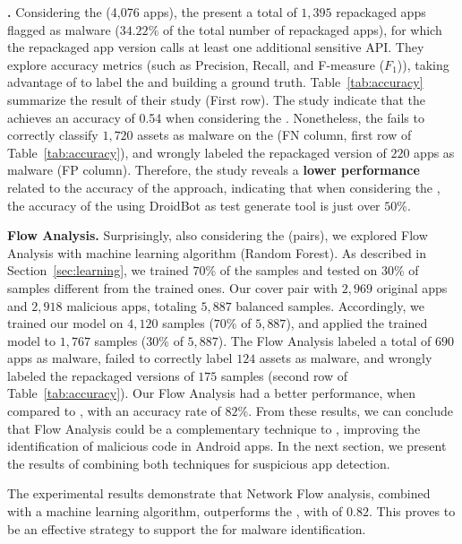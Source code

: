 {\bf \mas.} Considering the \cds (4,076 apps), the \fhc present
a total of {$1,395$} repackaged apps flagged as malware ({$34.22$\%} of the total number of repackaged apps), for which the repackaged app version calls at least one additional sensitive API. They explore accuracy metrics (such as Precision, Recall, and F-measure ($F_1$)), taking advantage of \vt to label the \cds and building a ground truth. Table~\ref{tab:accuracy} summarize the result of their study (First row). The study indicate that the \mas achieves an accuracy of 0.54 when considering the \cds. Nonetheless, the \mas fails to correctly classify $1,720$ assets as malware on the \cds (FN column, first row of Table~\ref{tab:accuracy}), and wrongly labeled the repackaged version of $220$ apps as malware (FP column). Therefore, the study reveals a {\bf lower performance} related to the accuracy of the approach, indicating that when considering the \cds, the accuracy of the \mas using DroidBot as test generate tool is just over $50$\%.

{\bf Flow Analysis.} Surprisingly, also considering the \cds (\apps pairs), we explored Flow Analysis with machine learning algorithm (Random Forest). As described in Section~\ref{sec:learning}, we trained $70$\% of the samples and tested on $30$\% of samples different from the trained ones. Our \cds cover \apps pair with $2,969$ original apps and $2,918$ malicious apps, totaling $5,887$ balanced samples. Accordingly, we trained our model on $4,120$ samples ($70$\% of $5,887$), and applied the trained model to $1,767$ samples ($30$\% of $5,887$). The Flow Analysis labeled a total of $690$ apps as malware, failed to correctly label $124$ assets as malware, and wrongly labeled the repackaged versions of $175$ samples (second row of Table~\ref{tab:accuracy}). Our Flow Analysis had a better performance, when compared to \mas, with an accuracy rate of $82$\%. From these results, we can conclude that Flow Analysis could be a complementary technique to \mas, improving the identification of malicious code in Android apps. In the next section, we present the results of combining both techniques for suspicious app detection.

\begin{finding}
The experimental results demonstrate that Network Flow analysis, combined with a machine learning algorithm, outperforms the \mas, with \fone of $0.82$. This proves to be an effective strategy to support the \mas for malware identification.
\end{finding}


